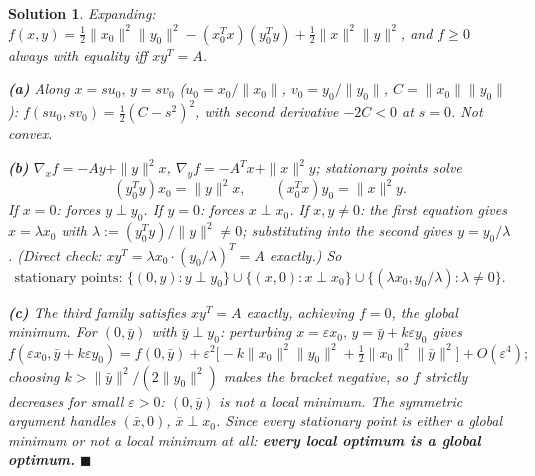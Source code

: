 \documentclass[11pt]{article}
\newtheorem*{solution}{Solution}
\begin{document}
\begin{solution}
Expanding: $f(x,y)=\tfrac12\|x_0\|^2\|y_0\|^2-(x_0^Tx)(y_0^Ty)+\tfrac12\|x\|^2\|y\|^2$, and $f\ge0$ always with equality iff $xy^T=A$.

\textbf{(a)} Along $x=su_0,\,y=sv_0$ ($u_0=x_0/\|x_0\|$, $v_0=y_0/\|y_0\|$, $C=\|x_0\|\|y_0\|$): $f(su_0,sv_0)=\tfrac12(C-s^2)^2$, with second derivative $-2C<0$ at $s=0$. Not convex.

\textbf{(b)} $\nabla_xf=-Ay+\|y\|^2x$, $\nabla_yf=-A^Tx+\|x\|^2y$; stationary points solve
\[
(y_0^Ty)x_0=\|y\|^2x, \qquad (x_0^Tx)y_0=\|x\|^2y.
\]
If $x=0$: forces $y\perp y_0$. If $y=0$: forces $x\perp x_0$. If $x,y\ne0$: the first equation gives $x=\lambda x_0$ with $\lambda:=(y_0^Ty)/\|y\|^2\ne0$; substituting into the second gives $y=y_0/\lambda$. (Direct check: $xy^T=\lambda x_0\cdot(y_0/\lambda)^T=A$ exactly.) So
\[
\text{stationary points: } \{(0,y):y\perp y_0\}\cup\{(x,0):x\perp x_0\}\cup\{(\lambda x_0,y_0/\lambda):\lambda\ne0\}.
\]

\textbf{(c)} The third family satisfies $xy^T=A$ exactly, achieving $f=0$, the global minimum. For $(0,\bar y)$ with $\bar y\perp y_0$: perturbing $x=\varepsilon x_0,\,y=\bar y+k\varepsilon y_0$ gives
\[
f(\varepsilon x_0,\bar y+k\varepsilon y_0) = f(0,\bar y) + \varepsilon^2\Big[-k\|x_0\|^2\|y_0\|^2+\tfrac12\|x_0\|^2\|\bar y\|^2\Big] + O(\varepsilon^4);
\]
choosing $k>\|\bar y\|^2/(2\|y_0\|^2)$ makes the bracket negative, so $f$ strictly decreases for small $\varepsilon>0$: $(0,\bar y)$ is not a local minimum. The symmetric argument handles $(\bar x,0)$, $\bar x\perp x_0$. Since every stationary point is either a global minimum or not a local minimum at all: \textbf{every local optimum is a global optimum.} $\blacksquare$
\end{solution}
\end{document}
